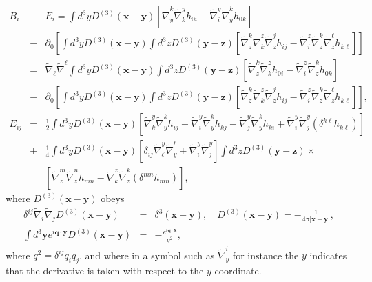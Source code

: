 \begin{eqnarray}
B_i &-&\dot{E}_i= \int d^3y D^{(3)}(\mathbf x - \mathbf y)\left[ \tilde\nabla^k_y \tilde\nabla_k^y h_{0i}
- \tilde\nabla_i^y \tilde\nabla^k_y h_{0k} \right]
\nonumber\\
&-&\partial_0\left[\int d^3y D^{(3)}(\mathbf x - \mathbf y) \int d^3z D^{(3)}(\mathbf y - \mathbf z)
\left[ \tilde\nabla^k_z \tilde\nabla_k^z \tilde\nabla^j_z h_{ij}-\tilde\nabla_i^z \tilde\nabla^k_z \tilde\nabla^{\ell}_z h_{k\ell}\right]\right]
\nonumber\\
&=&\tilde{\nabla}_{\ell}\tilde{\nabla}^{\ell} \int d^3y D^{(3)}(\mathbf x - \mathbf y) \int d^3z D^{(3)}(\mathbf y - \mathbf z)\left[ \tilde\nabla^k_z \tilde\nabla_k^z h_{0i}
- \tilde\nabla_i^z \tilde\nabla^k_z h_{0k} \right]
\nonumber\\
&-&\partial_0\left[\int d^3y D^{(3)}(\mathbf x - \mathbf y) \int d^3z D^{(3)}(\mathbf y - \mathbf z)
\left[ \tilde\nabla^k_z \tilde\nabla_k^z \tilde\nabla^j_z h_{ij}-\tilde\nabla_i^z \tilde\nabla^k_z \tilde\nabla^{\ell}_z h_{k\ell}\right]\right],
\nonumber\\
E_{ij}&=&\frac{1}{2}\int d^3yD^{(3)}(\mathbf{x}-\mathbf{y})\left[\tilde{\nabla}^y_k\tilde{\nabla}_y^kh_{ij}-\tilde{\nabla}^y_i\tilde{\nabla}_y^kh_{kj}-\tilde{\nabla}^y_j\tilde{\nabla}_y^kh_{ki}+\tilde{\nabla}^y_i\tilde{\nabla}^y_j(\delta^{k\ell}h_{k\ell})\right]
\nonumber\\
&+&\frac{1}{4}\int d^3yD^{(3)}(\mathbf{x}-\mathbf{y})\left[\delta_{ij}\tilde{\nabla}^y_{\ell}\tilde{\nabla}_y^{\ell}+\tilde{\nabla}^y_i\tilde{\nabla}^y_j\right]\int d^3zD^{(3)}(\mathbf{y}-\mathbf{z})\times
\nonumber\\
&&\left[\tilde{\nabla}_z^m \tilde{\nabla}_z^{n}h_{mn}-\tilde{\nabla}^z_k\tilde{\nabla}_z^k(\delta^{mn}h_{mn})\right],
\label{2.8}
\end{eqnarray}
%
where $D^{(3)}(\mathbf{x}-\mathbf{y})$ obeys 
%
\begin{eqnarray}
\delta^{ij}\tilde{\nabla}_i\tilde{\nabla}_jD^{(3)}(\mathbf{x}-\mathbf{y})&=&\delta^3(\mathbf{x}-\mathbf{y}),\quad
D^{(3)}(\mathbf{x}-\mathbf{y})=-\frac{1}{4\pi |\mathbf{x}-\mathbf{y}|},
\nonumber\\
\int d^3\mathbf{y}e^{i\mathbf{q}\cdot\mathbf{y}}D^{(3)}(\mathbf{x}-\mathbf{y})&=&-\frac{e^{i\mathbf{q}\cdot\mathbf{x}}}{q^2},
\label{2.9}
\end{eqnarray}
%
where $q^2=\delta^{ij}q_{i}q_{j}$, and where in a symbol such as $\tilde{\nabla}_y^i$ for instance the $y$ indicates that the derivative is taken with respect to the $y$ coordinate.

